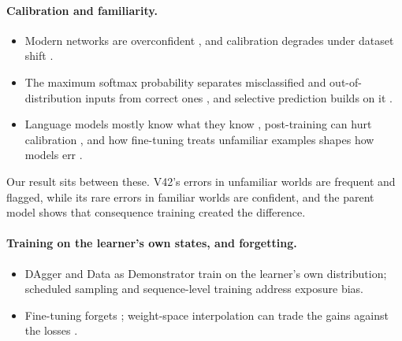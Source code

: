 \documentclass[11pt]{article}
\begin{document}
\paragraph{Calibration and familiarity.}
\begin{itemize}
  \item Modern networks are overconfident \cite{guo2017}, and calibration degrades under dataset shift
  \cite{ovadia2019}.
  \item The maximum softmax probability separates misclassified and out-of-distribution inputs from correct ones
  \cite{hendrycks2017}, and selective prediction builds on it \cite{geifman2017,kamath2020}.
  \item Language models mostly know what they know \cite{kadavath2022}, post-training can hurt calibration \cite{gpt4},
  and how fine-tuning treats unfamiliar examples shapes how models err \cite{kang2024}.
\end{itemize}
Our result sits between these. V42's errors in unfamiliar worlds are frequent and flagged, while its rare
errors in familiar worlds are confident, and the parent model shows that consequence training created the difference.

\paragraph{Training on the learner's own states, and forgetting.}
\begin{itemize}
  \item DAgger \cite{ross2011} and Data as Demonstrator \cite{venkatraman2015} train on the learner's own distribution;
  scheduled sampling \cite{bengio2015} and sequence-level training \cite{ranzato2016} address exposure bias.
  \item Fine-tuning forgets \cite{kirkpatrick2017,luo2023}; weight-space interpolation can trade the gains against the
  losses \cite{wortsman2022}.
\end{itemize}
\end{document}

